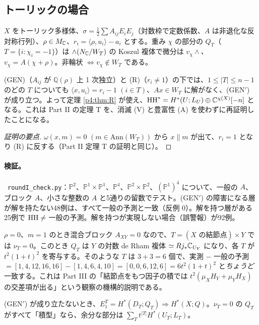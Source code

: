 \subsection{トーリックの場合}\label{p4:sec:toric}
$X$ をトーリック多様体、$\sigma=\tfrac12\sum A_{ij}E_iE_j$（対数枠で定数係数、$A$ は非退化な反対称行列）、$\rho\in M_\mathbb C$、$r_i=\langle\rho,u_i\rangle-a_i$ とする。重み $\chi$ の部分の $Q_T$（$T=\{i:\chi_i=-1\}$）は $\wedge(N_\mathbb C/W_T)$ の Koszul 複体で微分は $v_\chi\wedge$、$v_\chi=A(\chi+\rho)$。非輪状 $\iff v_\chi\notin W_T$ である。\tP
\begin{prop}\tP\label{p4:prop:toric}
(GEN)（$A_{ij}$ が $\mathbb Q(\rho)$ 上 1 次独立）と (R)（$r_i\neq1$）の下では、$1\le|T|\le n-1$ のどの $T$ についても $\langle x,u_i\rangle=r_i-1$ $(i\in T)$、$Ax\in W_T$ に解がなく、(GEN$'$) が成り立つ。よって定理 \ref{p4:thm:R} が使え、$\mathrm{HH}^*=H^*(U;L_U)\oplus\mathbb C^{\chi(X)}[-n]$ となる。これは Part II の定理 T を、消滅 (V) と豊富性 (A) を使わずに再証明したことになる。
\end{prop}
\begin{proof}[証明の要点]
$\omega(x,m)=0$ $(m\in\mathrm{Ann}(W_T))$ から $x\parallel m$ が出て、$r_i=1$ となり (R) に反する（Part II 定理 T の証明と同じ）。\qedhere
\end{proof}
\paragraph{検証。}\tV\ \texttt{roundI\_check.py}：$\mathbb P^2$、$\mathbb P^1\times\mathbb P^1$、$\mathbb P^4$、$\mathbb P^2\times\mathbb P^2$、$(\mathbb P^1)^4$ について、一般の $A$、ブロック $A$、小さな整数の $A$ と5通りの留数でテスト。(GEN$'$) の障害になる層が解を持たない48例は、すべて一般の予測と一致（反例 0）。解を持つ層がある25例で $\mathrm{HH}\neq$ 一般の予測。解を持つが実現しない場合（誤警報）が92例。

\begin{ex}[$\mathbb P^2\times\mathbb P^2$、ブロック $A=A_X\oplus A_Y$]\tP\tV
$\rho=0$、$m=1$ のとき混合ブロック $A_{XY}=0$ なので、$T=(X\text{ の結節点})\times Y$ では $\nu_T=0$。このとき $Q_T$ は $Y$ の対数 de Rham 複体 $\simeq Rj_*\mathbb C_{U_Y}$ になり、各 $T$ が $t^2(1+t)^2$ を寄与する。そのような $T$ は $3+3=6$ 個で、実測 $-$ 一般の予測 $=[1,4,12,16,16]-[1,4,6,4,10]=[0,0,6,12,6]=6t^2(1+t)^2$ と\emph{ちょうど}一致する。これは Part III の「結節点をもつ因子の積では $t^2(\mu_XH_Y+\mu_YH_X)$ の交差項が出る」という観察の機構的説明である。
\end{ex}
\begin{conj}[\tK\ 層が非輪状でない場合]\label{p4:conj:nonacyc}
(GEN$'$) が成り立たないとき、$E_1^T=H^*(D_T;Q_T)\Rightarrow H^*(X;Q)$。$\nu_T=0$ の $Q_T$ がすべて「積型」なら、余分な部分は $\sum_Tt^{|T|}H^*(U_T;L_T)$。
\end{conj}

